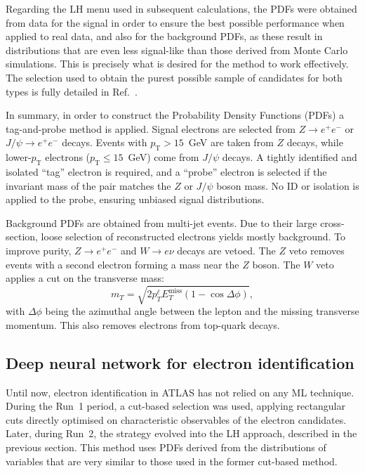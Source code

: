 Regarding the LH menu used in subsequent calculations, the PDFs were obtained from data for the signal in order to ensure the best possible performance when applied to real data, and also for the background PDFs, as these result in distributions that are even less signal-like than those derived from Monte Carlo simulations. This is precisely what is desired for the method to work effectively.
The selection used to obtain the purest possible sample of candidates for both types is fully detailed in Ref.~\cite{lucas_thesis}.

In summary, in order to construct the Probability Density Functions (PDFs) a tag-and-probe method is applied. Signal electrons are selected from $Z \rightarrow e^{+}e^{-}$ or $J/\psi \rightarrow e^{+}e^{-}$ decays. Events with $p_{\text{T}} > 15$~GeV are taken from $Z$ decays, while lower-$p_{\text{T}}$ electrons ($p_{\text{T}} \leq 15$~GeV) come from $J/\psi$ decays. A tightly identified and isolated “tag” electron is required, and a “probe” electron is selected if the invariant mass of the pair matches the $Z$ or $J/\psi$ boson mass. No ID or isolation is applied to the probe, ensuring unbiased signal distributions.

Background PDFs are obtained from multi-jet events. Due to their large cross-section, loose selection of reconstructed electrons yields mostly background. To improve purity, $Z \rightarrow e^{+}e^{-}$ and $W \rightarrow e\nu$ decays are vetoed. The $Z$ veto removes events with a second electron forming a mass near the $Z$ boson. The $W$ veto applies a cut on the transverse mass:
\[
m_T = \sqrt{2p_T^\ell E_T^{\text{miss}}(1 - \cos{\Delta\phi})},
\]
with $\Delta\phi$ being the azimuthal angle between the lepton and the missing transverse momentum. This also removes electrons from top-quark decays.


\subsection{Deep neural network for electron identification}

Until now, electron identification in ATLAS has not relied on any ML technique. During the Run~1 period, a cut-based selection was used, applying rectangular cuts directly optimised on characteristic observables of the electron candidates. Later, during Run~2, the strategy evolved into the LH approach, described in the previous section. This method uses PDFs derived from the distributions of variables that are very similar to those used in the former cut-based method.

